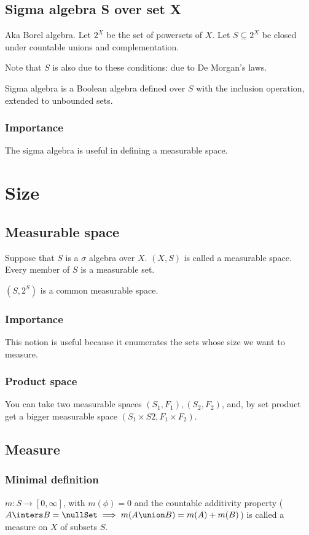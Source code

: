 \documentclass[oneside, article]{memoir}
\begin{document}
\section{Sigma algebra S over set X}
Aka Borel algebra. Let $2^{X}$ be the set of powersets of $X$. Let $S \subseteq 2^{X}$ be closed under countable unions and complementation.

Note that $S$ is also  due to these conditions: due to De Morgan's laws.

Sigma algebra is a  Boolean algebra defined over $S$ with the inclusion operation, extended to unbounded sets.

\subsection{Importance}
The sigma algebra is useful in defining a measurable space.

\chapter{Size}
\section{Measurable space}
Suppose that $S$ is a $\sigma$ algebra over $X$. $(X, S)$ is called a measurable space. Every member of $S$ is a measurable set.

$(S, 2^{S})$ is a common measurable space.

\subsection{Importance}
This notion is useful because it enumerates the sets whose size we want to measure.

\subsection{Product space}
You can take two measurable spaces $(S_1, F_1), (S_2, F_2)$, and, by set product get a bigger measurable space $(S_1 \times S2, F_1 \times F_2)$.

\section{Measure}
\subsection{Minimal definition}
$m:S\to [0, \infty]$, with $m(\phi)=0$ and the countable additivity property ($A \inters B= \nullSet \implies m(A \union B) = m(A) + m(B)$) is called a measure on $X$ of subsets $S$.
\end{document}
